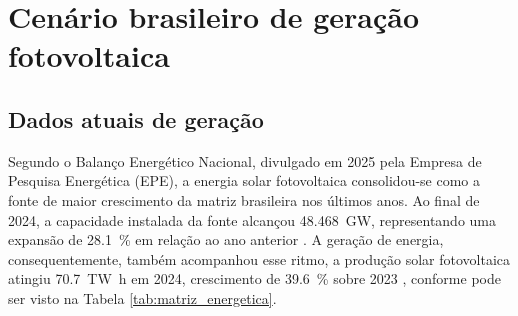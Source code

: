 

\section{Cenário brasileiro de geração fotovoltaica}
\subsection{Dados atuais de geração}
\label{sec:cenario_brasileiro}

Segundo o Balanço Energético Nacional, divulgado em 2025 pela Empresa de
Pesquisa Energética (EPE), a energia solar fotovoltaica consolidou-se como a
fonte de maior crescimento da matriz brasileira nos últimos anos. Ao final de
2024, a capacidade instalada da fonte alcançou \SI{48,468}{\giga\watt},
representando uma expansão de \SI{28,1}{\percent} em relação ao ano anterior
\cite{EPE2025}. A geração de energia, consequentemente, também acompanhou esse ritmo, a produção solar fotovoltaica atingiu \SI{70,7}{\tera\watt\hour} em 2024, crescimento de
\SI{39,6}{\percent} sobre 2023 \cite{EPE2025}, conforme pode ser visto na Tabela \ref{tab:matriz_energetica}.

